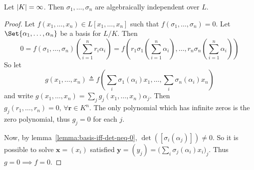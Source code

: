 \begin{lemma} \label{lemma:automorphisms-are-alg-indep}
  Let $\lvert K\rvert = \infty$. Then $\sigma_1, \dots, \sigma_n$ are algebraically independent over $L$.

  \begin{proof}
    Let $f(x_1, \dots, x_n) \in L[x_1, \dots, x_n]$ such that $f(\sigma_1, \dots, \sigma_n) = 0$.
    Let $\Set{\alpha_1, \dots, \alpha_n}$ be a basis for $L/K$. Then
    \[ 0 = f(\sigma_1, \dots, \sigma_n)\left( \sum_{i = 1}^n r_i \alpha_i \right)
      = f \left(r_1 \sigma_1 \left( \sum_{i = 1}^n \alpha_i \right), \dots,
        r_n \sigma_n \left( \sum_{i = 1}^n \alpha_i \right) \right) \]
    So let
    \[ g(x_1, \dots, x_n) \triangleq f \left(\sum_i \sigma_1(\alpha_i) x_1,
      \dots, \sum_i \sigma_n(\alpha_i) x_n \right) \]
    and write $g(x_1, \dots, x_n) = \sum_j g_j(x_1, \dots, x_n) \alpha_j$.
    Then $g_j(r_1, \dots, r_n) = 0, \, \forall \bm{r} \in K^n$. The only
    polynomial which has infinite zeros is the zero polynomial, thus $g_j = 0$ for each $j$.

    Now, by lemma~\ref{lemma:basis-iff-det-neq-0}, $\det([\sigma_i(\alpha_j)]) \neq 0$.
    So it is possible to solve $\bm{x} = (x_i)$ satisfied
    $\bm{y} = (y_j) = \big( \sum_i \sigma_j(\alpha_i) x_i \big)_j$.
    Thus $g = 0 \implies f = 0$.
  \end{proof}
\end{lemma}

